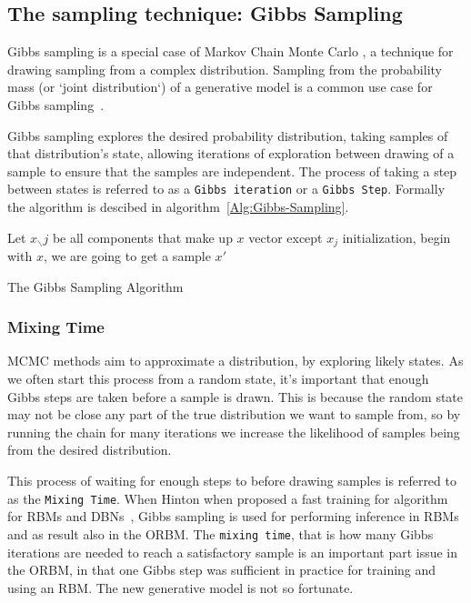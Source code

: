 \subsection{The sampling technique: Gibbs Sampling}

Gibbs sampling is a special case of Markov Chain Monte Carlo \cite{hastings70}, a technique for drawing sampling from a complex distribution. Sampling from the probability mass (or `joint distribution`) of a generative model is a common use case for Gibbs sampling~\cite{Pearl:1988:PRI:52121}.

Gibbs sampling explores the desired probability distribution, taking samples of that distribution's state, allowing iterations of exploration between drawing of a sample to ensure that the samples are independent\todocite{}. The process of taking a step between states is referred to as a \texttt{Gibbs iteration} or a \texttt{Gibbs Step}. Formally the algorithm is descibed in algorithm~\ref{Alg:Gibbs-Sampling}.

\begin{algorithm}[!ht]
 Let $ x_{\smallsetminus} j$ be all components that make up $x$ vector except $x_j$\;
 initialization, begin with $x$, we are going to get a sample $x'$\;
 \caption{The Gibbs Sampling Algorithm}\label{Alg:Gibbs-Sampling}
\end{algorithm}

\subsubsection{Mixing Time}

MCMC methods aim to approximate a distribution, by exploring likely states. As we often start this process from a random state, it's important that enough Gibbs steps are taken before a sample is drawn. This is because the random state may not be close any part of the true distribution we want to sample from, so by running the chain for many iterations we increase the likelihood of samples being from the desired distribution.

This process of waiting for enough steps to before drawing samples is referred to as the \texttt{Mixing Time}. When Hinton when proposed a fast training for algorithm for RBMs and DBNs~\cite{Hinton:2006:FLA:1161603.1161605}, Gibbs sampling is used for performing inference in RBMs and as result also in the ORBM. The \texttt{mixing time}, that is how many Gibbs iterations are needed to reach a satisfactory sample is an important part issue in the ORBM, in that one Gibbs step was sufficient in practice for training and using an RBM. The new generative model is not so fortunate.



